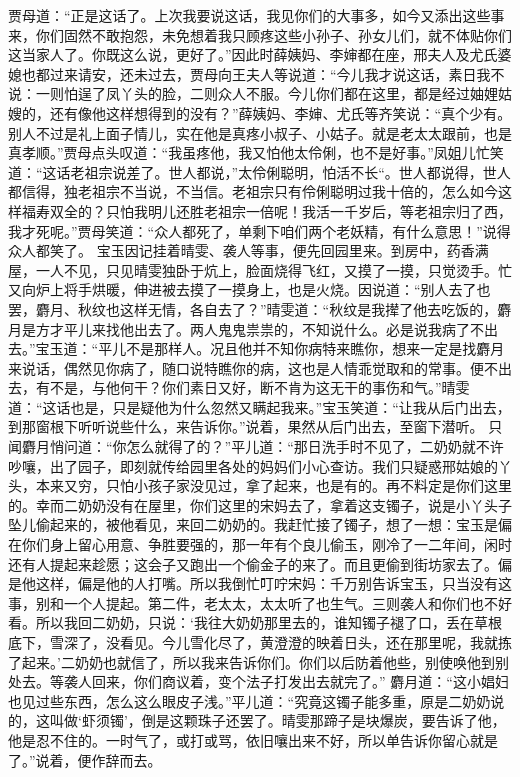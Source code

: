 \documentclass[12pt,oneside]{book}
\begin{document}
贾母道：“正是这话了。上次我要说这话，我见你们的大事多，如今又添出这些事来，你们固然不敢抱怨，未免想着我只顾疼这些小孙子、孙女儿们，就不体贴你们这当家人了。你既这么说，更好了。”因此时薛姨妈、李婶都在座，邢夫人及尤氏婆媳也都过来请安，还未过去，贾母向王夫人等说道：“今儿我才说这话，素日我不说：一则怕逞了凤丫头的脸，二则众人不服。今儿你们都在这里，都是经过妯娌姑嫂的，还有像他这样想得到的没有？”薛姨妈、李婶、尤氏等齐笑说：“真个少有。别人不过是礼上面子情儿，实在他是真疼小叔子、小姑子。就是老太太跟前，也是真孝顺。”贾母点头叹道：“我虽疼他，我又怕他太伶俐，也不是好事。”凤姐儿忙笑道：“这话老祖宗说差了。世人都说，”太伶俐聪明，怕活不长“。世人都说得，世人都信得，独老祖宗不当说，不当信。老祖宗只有伶俐聪明过我十倍的，怎么如今这样福寿双全的？只怕我明儿还胜老祖宗一倍呢！我活一千岁后，等老祖宗归了西，我才死呢。”贾母笑道：“众人都死了，单剩下咱们两个老妖精，有什么意思！”说得众人都笑了。
宝玉因记挂着晴雯、袭人等事，便先回园里来。到房中，药香满屋，一人不见，只见晴雯独卧于炕上，脸面烧得飞红，又摸了一摸，只觉烫手。忙又向炉上将手烘暖，伸进被去摸了一摸身上，也是火烧。因说道：“别人去了也罢，麝月、秋纹也这样无情，各自去了？”晴雯道：“秋纹是我撵了他去吃饭的，麝月是方才平儿来找他出去了。两人鬼鬼祟祟的，不知说什么。必是说我病了不出去。”宝玉道：“平儿不是那样人。况且他并不知你病特来瞧你，想来一定是找麝月来说话，偶然见你病了，随口说特瞧你的病，这也是人情乖觉取和的常事。便不出去，有不是，与他何干？你们素日又好，断不肯为这无干的事伤和气。”晴雯道：“这话也是，只是疑他为什么忽然又瞒起我来。”宝玉笑道：“让我从后门出去，到那窗根下听听说些什么，来告诉你。”说着，果然从后门出去，至窗下潜听。
只闻麝月悄问道：“你怎么就得了的？”平儿道：“那日洗手时不见了，二奶奶就不许吵嚷，出了园子，即刻就传给园里各处的妈妈们小心查访。我们只疑惑邢姑娘的丫头，本来又穷，只怕小孩子家没见过，拿了起来，也是有的。再不料定是你们这里的。幸而二奶奶没有在屋里，你们这里的宋妈去了，拿着这支镯子，说是小丫头子坠儿偷起来的，被他看见，来回二奶奶的。我赶忙接了镯子，想了一想：宝玉是偏在你们身上留心用意、争胜要强的，那一年有个良儿偷玉，刚冷了一二年间，闲时还有人提起来趁愿；这会子又跑出一个偷金子的来了。而且更偷到街坊家去了。偏是他这样，偏是他的人打嘴。所以我倒忙叮咛宋妈：千万别告诉宝玉，只当没有这事，别和一个人提起。第二件，老太太，太太听了也生气。三则袭人和你们也不好看。所以我回二奶奶，只说：‘我往大奶奶那里去的，谁知镯子褪了口，丢在草根底下，雪深了，没看见。今儿雪化尽了，黄澄澄的映着日头，还在那里呢，我就拣了起来。’二奶奶也就信了，所以我来告诉你们。你们以后防着他些，别使唤他到别处去。等袭人回来，你们商议着，变个法子打发出去就完了。”
麝月道：“这小娼妇也见过些东西，怎么这么眼皮子浅。”平儿道：“究竟这镯子能多重，原是二奶奶说的，这叫做‘虾须镯’，倒是这颗珠子还罢了。晴雯那蹄子是块爆炭，要告诉了他，他是忍不住的。一时气了，或打或骂，依旧嚷出来不好，所以单告诉你留心就是了。”说着，便作辞而去。
\end{document}

